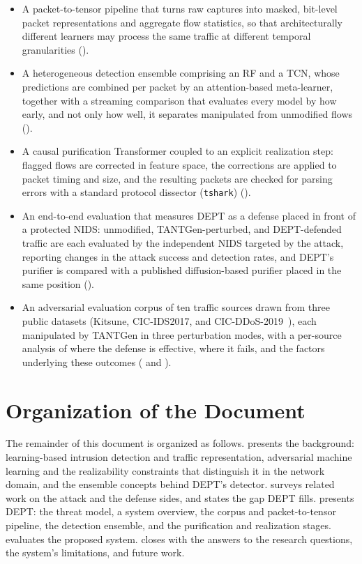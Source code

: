 \begin{itemize}
    \item A packet-to-tensor pipeline that turns raw captures into masked,
    bit-level packet representations and aggregate flow statistics, so
    that architecturally different learners may process the same traffic at different
    temporal granularities ().
    \item A heterogeneous detection ensemble comprising an \ac{RF} and a \ac{TCN}, whose predictions are combined per packet by an attention-based meta-learner, together with a streaming comparison
    that evaluates every model by how early, and not only how well, it separates
    manipulated from unmodified flows ().
    \item A causal purification Transformer coupled to an explicit realization step:
    flagged flows are corrected in feature space, the corrections are applied to packet timing and size, and the resulting packets are checked for parsing errors with a standard protocol dissector (\texttt{tshark})
    ().
    \item An end-to-end evaluation that measures DEPT as a defense placed in
    front of a protected NIDS: unmodified, TANTGen-perturbed, and DEPT-defended traffic are
    each evaluated by the independent NIDS targeted by the attack, reporting changes in the attack success and detection rates, and DEPT's purifier is compared with a published diffusion-based purifier placed in the same position ().
    \item An adversarial evaluation corpus of ten traffic sources drawn from three public
    datasets
    (Kitsune, CIC-IDS2017, and CIC-DDoS-2019~\cite{mirsky2018kitsune,sharafaldin2018cicids,sharafaldin2019cicddos}),
    each manipulated by TANTGen in three perturbation modes, with a per-source analysis
    of where the defense is effective, where it fails, and the factors underlying these outcomes ( and
    ).
\end{itemize}

\section{Organization of the Document}\label{sec:intro-organization}
The remainder of this document is organized as follows.  presents the
background: learning-based intrusion detection and traffic representation, adversarial
machine learning and the realizability constraints that distinguish it in the network
domain, and the ensemble concepts behind DEPT's detector.  surveys
related work on the attack and the defense sides, and states the gap DEPT fills.  presents DEPT:
the threat model, a system overview, the corpus and packet-to-tensor pipeline, the
detection ensemble, and the purification and realization stages. 
evaluates the proposed system. 
closes with the answers to the research questions, the system's limitations, and future
work.
